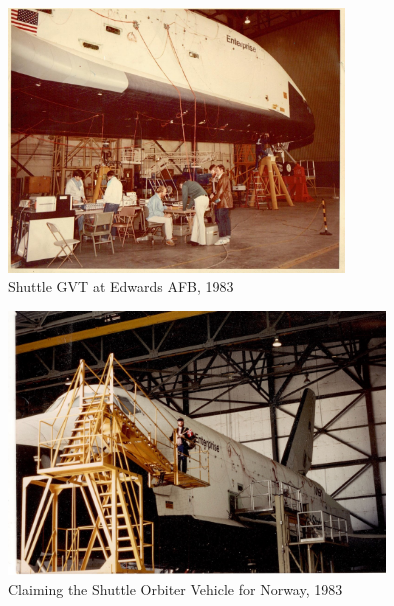 \documentclass[aspectratio=169,10pt]{beamer} \mode<presentation>
\begin{document}
\begin{frame}
  \begin{figure}
    \centering
    \includegraphics[width=0.65\linewidth,height=7cm]{SDRC-shuttle-1983}
    \caption{Shuttle GVT at Edwards AFB, 1983}
  \end{figure}
\end{frame}

\begin{frame}
  \begin{figure}
    \centering
    \includegraphics[width=0.65\linewidth,height=7cm]{Shuttle-1983}
    \caption{Claiming the Shuttle Orbiter Vehicle for Norway, 1983}
  \end{figure}
\end{frame}
\end{document}
